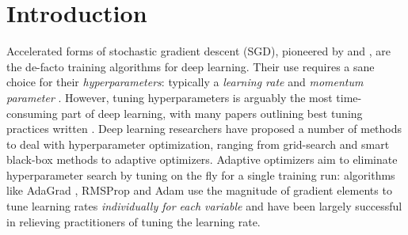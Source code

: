 \documentclass{article} %
\newcommand{\yell}[1]{#1}
\begin{document}
\section{Introduction}
Accelerated forms of stochastic gradient descent (SGD), pioneered by
\citet{polyak1964some} and \citet{nesterov1983method}, are the de-facto
training algorithms for deep learning.
Their use requires a sane choice for their {\em hyperparameters}: 
typically a {\em learning rate} and {\em momentum parameter} \citep{sutskever2013importance}.
However, tuning hyperparameters is arguably the most time-consuming part of deep learning, with many papers outlining best tuning practices written
\citep{bengio2012practical,orr2003neural,bengio2012deep,bottou2012stochastic}.
Deep learning researchers have proposed a number of methods to deal with hyperparameter optimization, ranging from grid-search and 
smart black-box methods \citep{bergstra2012random,snoek2012practical}
to adaptive optimizers.
Adaptive optimizers aim to eliminate hyperparameter search by tuning on the fly for a single training run:
algorithms like AdaGrad \citep{duchi2011adaptive}, RMSProp \citep{tieleman2012lecture} and Adam \citep{kingma2014adam} use the magnitude of gradient elements to tune learning rates {\em individually for each variable} and  have been largely successful in relieving practitioners of tuning the learning rate. 
\end{document}
